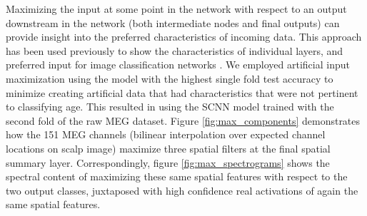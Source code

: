 \documentclass[fleqn,10pt]{wlscirep}
\begin{document}
Maximizing the input at some point in the network with respect to an output downstream in the network (both intermediate nodes and final outputs) can provide insight into the preferred characteristics of incoming data. This approach has been used previously to show the characteristics of individual layers, and preferred input for image classification networks \cite{Yosinski2015}. We employed artificial input maximization using the model with the highest single fold test accuracy to minimize creating artificial data that had characteristics that were not pertinent to classifying age. This resulted in using the SCNN model trained with the second fold of the raw MEG dataset. Figure \ref{fig:max_components} demonstrates how the 151 MEG channels (bilinear interpolation over expected channel locations on scalp image)  maximize three spatial filters at the final spatial summary layer. Correspondingly, figure \ref{fig:max_spectrograms} shows the spectral content of maximizing these same spatial features with respect to the two output classes, juxtaposed with high confidence real activations of again the same spatial features.
\end{document}
